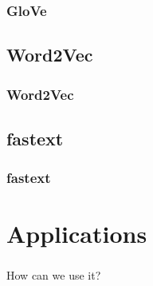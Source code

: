 
\begin{frame}
\frametitle{GloVe}


\end{frame}


\subsection{Word2Vec}


\begin{frame}
\frametitle{Word2Vec}


\end{frame}


\subsection{fastext}


\begin{frame}
\frametitle{fastext}


\end{frame}


\section{Applications}


\begin{frame}
\frametitle{}

\begin{center}
	\Huge {How can we use it?}
\end{center}
\end{frame}

